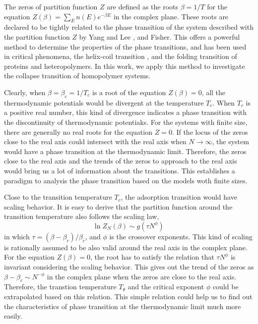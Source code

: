 \documentclass[preprint,preprintnumbers,amsmath,amssymb,showpacs,aps,pre]{revtex4-1}
\begin{document}

The zeros of partition function $Z$ are defined as the roots $\beta=1/T$
for the equation $Z(\beta)=\sum_E n(E)e^{-\beta E}$ in the complex plane.
These roots are declared to be tightly related to the phase transition
of the system described with the partition function $Z$ by Yang and Lee
\cite{LYPR52}, and Fisher\cite{FisherBook}. This offers a powerful method
to determine the properties of the phase transitions, and has been used
in critical phenomena\cite{LipowskiIJMPB05}, the helix-coil transition
\cite{HansmannPRL00,HansmannPA01}, and the folding transition of
proteins and heteropolymers\cite{WangJCP03,ChenPA05}.
In this work, we apply this method to investigate
the collapse transition of homopolymer systems.

Clearly, when $\beta=\beta_c=1/T_c$ is a root of the equation $Z(\beta)=0$, all
the thermodynamic potentials would be divergent at the temperature $T_c$. When
$T_c$ is a positive real number, this kind of divergence indicates a phase
transition with the discontinuity of thermodynamic potentiaks. For the systems
with finite size, there are generally no real roots for the equation $Z=0$.
If the locus of the zeros close to the real axis could intersect with the
real axis when $N\rightarrow\infty$, the system would have a phase transition
at the thermodynamic limit. Therefore, the zeros close to the real axis and
the trends of the zeros to approach to the real axis would bring us a lot of
information about the transitions. This establishes a paradigm to analysis
the phase transition based on the models woth finite sizes.

Close to the transition temperature $T_c$, the adsorption transition
would have scaling behavior. It is easy to derive that the partition
function around the transition temperature also follows the scaling law,
\begin{equation}
\ln Z_N(\beta) \sim g(\tau N^{\phi}) \,
\end{equation}
in which $\tau=(\beta-\beta_c)/\beta_c$, and $\phi$ is the crossover
exponents.  This kind of scaling is rationally assumed to be also valid
around the real axis in
the complex plane. For the equation $Z(\beta)=0$, the root has to satisfy
the relation that $\tau N^{\phi}$ is invariant considering the scaling
behavior. This gives out the trend of the zeros as 
$\beta-\beta_c \sim N^{-\phi}$ in the complex plane when the zeros are
close to the real axis. Therefore, the
transtion temperature $T_{\theta}$ and the critical exponent $\phi$ could be
extrapolated based on this relation. This simple relation could help us to
find out the characteristics of phase transition at the thermodynamic limit
much more easily.
\end{document}
